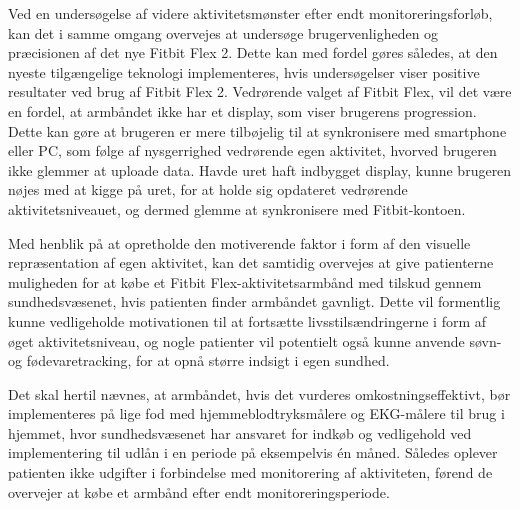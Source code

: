 Ved en undersøgelse af videre aktivitetsmønster efter endt monitoreringsforløb, kan det i samme omgang overvejes at undersøge brugervenligheden og præcisionen af det nye Fitbit Flex 2. Dette kan med fordel gøres således, at den nyeste tilgængelige teknologi implementeres, hvis undersøgelser viser positive resultater ved brug af Fitbit Flex 2. Vedrørende valget af Fitbit Flex, vil det være en fordel, at armbåndet ikke har et display, som viser brugerens progression. Dette kan gøre at brugeren er mere tilbøjelig til at synkronisere med smartphone eller PC, som følge af nysgerrighed vedrørende egen aktivitet, hvorved brugeren ikke glemmer at uploade data. Havde uret haft indbygget display, kunne brugeren nøjes med at kigge på uret, for at holde sig opdateret vedrørende aktivitetsniveauet, og dermed glemme at synkronisere med Fitbit-kontoen.

Med henblik på at opretholde den motiverende faktor i form af den visuelle repræsentation af egen aktivitet, kan det samtidig overvejes at give patienterne muligheden for at købe et Fitbit Flex-aktivitetsarmbånd med tilskud gennem sundhedsvæsenet, hvis patienten finder armbåndet gavnligt. Dette vil formentlig kunne vedligeholde motivationen til at fortsætte livsstilsændringerne i form af øget aktivitetsniveau, og nogle patienter vil potentielt også kunne anvende søvn- og fødevaretracking, for at opnå større indsigt i egen sundhed. 

Det skal hertil nævnes, at armbåndet, hvis det vurderes omkostningseffektivt, bør implementeres på lige fod med hjemmeblodtryksmålere og EKG-målere til brug i hjemmet, hvor sundhedsvæsenet har ansvaret for indkøb og vedligehold ved implementering til udlån i en periode på eksempelvis én måned. Således oplever patienten ikke udgifter i forbindelse med monitorering af aktiviteten, førend de overvejer at købe et armbånd efter endt monitoreringsperiode.